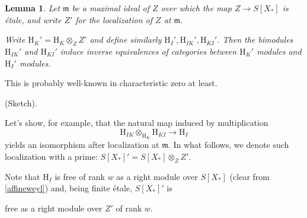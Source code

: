 \documentclass[10pt]{amsart}
\newcommand{\locally}{}
\newtheorem{lemma}[subsection]{Lemma}
\theoremstyle{remark}
\begin{document}
\begin{lemma} \label{IHequivalence}
Let $\mathfrak{m}$ be a maximal ideal of $Z$ 
over which the map $Z \rightarrow S[X_*]$ is {\'e}tale,
and write $Z'$ for the localization of $Z$ at $\mathfrak{m}$. 
 
 
  
   Write $\mathrm{H}_K' = \mathrm{H}_K \otimes_{Z} Z'$ and define similarly
$\mathrm{H}_I', \mathrm{H}_{IK}', \mathrm{H}_{KI}'$. 
Then the bimodules $\mathrm{H}_{IK}'$ and $\mathrm{H}_{KI}'$
induce inverse equivalences of categories between $\mathrm{H}_K'$ modules and $\mathrm{H}_I'$ modules. \end{lemma}  
This is probably well-known in characteristic zero at least.



\proof   (Sketch). 


Let's show, for example, that the natural map induced by multiplication  
\begin{equation} \label{targetmap}
  \mathrm{H}_{IK} \otimes_{\mathrm{H}_K}  \mathrm{H}_{KI}
 \rightarrow \mathrm{H}_I \end{equation}
yields an isomorphism after localization at $\mathfrak{m}$. 
In what follows, we denote such localization with a prime: $S[X_*]' = S[X_*] \otimes_Z Z'$. 

Note that  $\mathrm{H}_I$  is  free of rank $w$ as a right module over $S[X_*]$  (clear from \eqref{affineweyl}) 
and, being finite {\'e}tale, $S[X_*]'$ is
\locally
free as a right module over $Z'$
of rank $w$.
\end{document}

